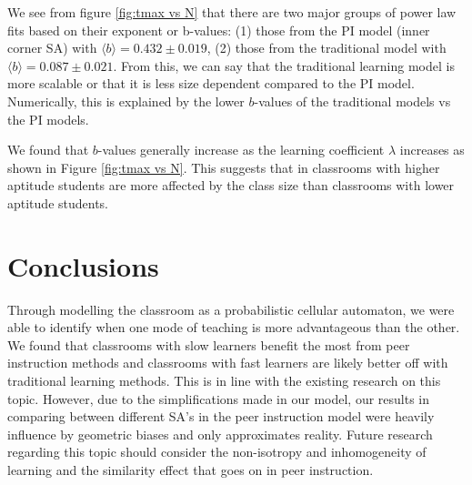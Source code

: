 \documentclass[10pt,a4paper,twoside]{article}
\begin{document}
  

We see from figure \ref{fig:tmax vs N} that there are two major groups of power law fits based on their exponent or b-values: (1) those from the PI model (inner corner SA) with $\langle b \rangle = 0.432 \pm 0.019$, (2) those from the traditional model with $\langle b \rangle = 0.087\pm0.021$. From this, we can say that the traditional learning model is more scalable or that it is less size dependent compared to the PI model. Numerically, this is explained by the lower $b$-values of the traditional models vs the PI models. 

We found that $b$-values generally increase as the learning coefficient $\lambda$ increases as shown in Figure \ref{fig:tmax vs N}. This suggests that in classrooms with higher aptitude students are more affected by the class size than classrooms with lower aptitude students.

\section{Conclusions}
Through modelling the classroom as a probabilistic cellular automaton, we were able to identify when one mode of teaching is more advantageous than the other. We found that classrooms with slow learners benefit the most from peer instruction methods and classrooms with fast learners are likely better off with traditional learning methods. This is in line with the existing research on this topic. However, due to the simplifications made in our model, our results in comparing between different SA's in the peer instruction model were heavily influence by geometric biases and only approximates reality. Future research regarding this topic should consider the non-isotropy and inhomogeneity of learning and the similarity effect that goes on in peer instruction.
\end{document}
